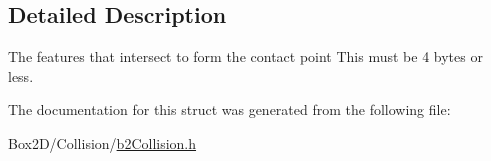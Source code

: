 \subsection{Detailed Description}
The features that intersect to form the contact point This must be 4 bytes or less. 

The documentation for this struct was generated from the following file\+:\begin{DoxyCompactItemize}
\item 
Box2\+D/\+Collision/\hyperlink{b2_collision_8h}{b2\+Collision.\+h}\end{DoxyCompactItemize}
